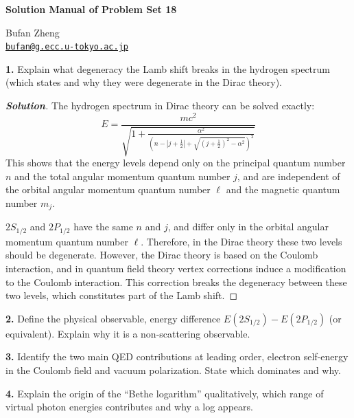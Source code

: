 \documentclass[11pt]{article}
\newenvironment{solution}[1][]{\begin{proof}[\textbf{Solution}]}{\end{proof}}
\begin{document}
\begin{center}
    {\LARGE \textbf{Solution Manual of Problem Set 18} \par}
    \vspace{1em}
    {\large Bufan Zheng\\ \href{mailto:bufan@g.ecc.u-tokyo.ac.jp}{\texttt{bufan@g.ecc.u-tokyo.ac.jp}} \par}
\end{center}


\begin{tcolorbox}[problem]
\textbf{1.} Explain what degeneracy the Lamb shift breaks in the hydrogen spectrum (which states and why they were degenerate in the Dirac theory).
\end{tcolorbox}
\begin{solution}[18.1]
The hydrogen spectrum in Dirac theory can be solved exactly:
\[
E=\frac{mc^2}{\sqrt{1+\frac{\alpha^2}{\left(n-\left|j+\frac12\right|+\sqrt{(j+\frac12)^2-\alpha^2}\right)^2}}}
\]
This shows that the energy levels depend only on the principal quantum number $n$ and the total angular momentum quantum number $j$, and are independent of the orbital angular momentum quantum number $\ell$ and the magnetic quantum number $m_j$.

$2S_{1/2}$ and $2P_{1/2}$ have the same $n$ and $j$, and differ only in the orbital angular momentum quantum number $\ell$. Therefore, in the Dirac theory these two levels should be degenerate. However, the Dirac theory is based on the Coulomb interaction, and in quantum field theory vertex corrections induce a modification to the Coulomb interaction. This correction breaks the degeneracy between these two levels, which constitutes part of the Lamb shift.
\end{solution}
\begin{tcolorbox}[problem]
\textbf{2.} Define the physical observable, energy difference $E(2S_{1/2})-E(2P_{1/2})$ (or equivalent). Explain why it is a non-scattering observable.
\end{tcolorbox}

\begin{tcolorbox}[problem]
\textbf{3.} Identify the two main QED contributions at leading order, electron self-energy in the Coulomb field and vacuum polarization. State which dominates and why.
\end{tcolorbox}

\begin{tcolorbox}[problem]
\textbf{4.} Explain the origin of the ``Bethe logarithm'' qualitatively, which range of virtual photon energies contributes and why a log appears.
\end{tcolorbox}
\end{document}
